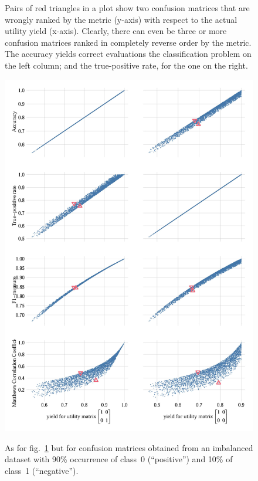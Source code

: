 \documentclass[\ifafour a4paper,12pt,\else a5paper,10pt,\fi%
onecolumn,oneside,article,%
british%
]{memoir}
\theoremstyle{remark}
\theoremstyle{innote}
\renewcommand*{\|}[1][]{\nonscript\:#1\vert\nonscript\:\mathopen{}}
\newcommand*{\fig}{fig.}%
\begin{document}
\begin{figure}[p]
{%
  Pairs of {\color{myred}red triangles} in a plot show two confusion matrices that are wrongly ranked by the metric (y-axis) with respect to the actual utility yield (x-axis). Clearly, there can even be three or more confusion matrices ranked in completely reverse order by the metric.
%
  The accuracy yields correct evaluations the classification problem on the left column; and the true-positive rate, for the one on the right. }
  \label{fig:metrics_vs_utility}
\end{figure}
\begin{figure}[p]
  \centering
\includegraphics[width=0.95\linewidth]{utility_vs_metrics2_0.9.jpg}\\%
\caption{As for \fig~\ref{fig:metrics_vs_utility} but for confusion matrices obtained from an imbalanced dataset with 90\% occurrence of class~0 (\enquote{positive}) and 10\% of class~1 (\enquote{negative}).}
  \label{fig:metrics_vs_utility2}
\end{figure}
\end{document}

